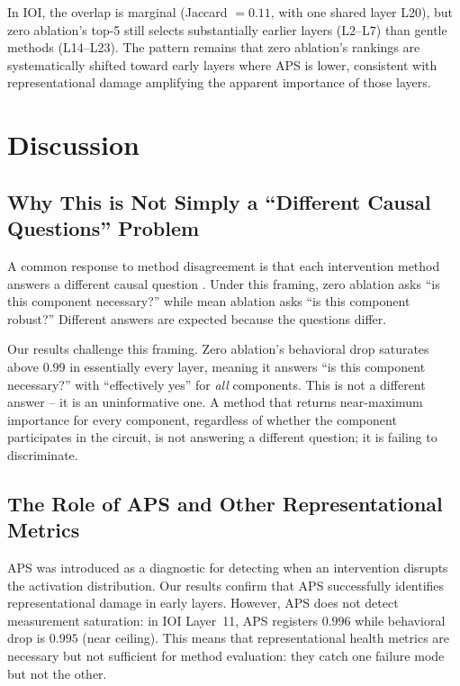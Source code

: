 \documentclass[pdflatex,sn-mathphys-num]{sn-jnl}
\begin{document}
In IOI, the overlap is marginal (Jaccard $= 0.11$, with one shared layer L20), but zero ablation's top-5 still selects substantially earlier layers (L2--L7) than gentle methods (L14--L23). The pattern remains that zero ablation's rankings are systematically shifted toward early layers where APS is lower, consistent with representational damage amplifying the apparent importance of those layers.

\section{Discussion}

\subsection{Why This is Not Simply a ``Different Causal Questions'' Problem}

A common response to method disagreement is that each intervention method answers a different causal question \citep{Miller2024}. Under this framing, zero ablation asks ``is this component necessary?'' while mean ablation asks ``is this component robust?'' Different answers are expected because the questions differ.

Our results challenge this framing. Zero ablation's behavioral drop saturates above $0.99$ in essentially every layer, meaning it answers ``is this component necessary?'' with ``effectively yes'' for \emph{all} components. This is not a different answer -- it is an uninformative one. A method that returns near-maximum importance for every component, regardless of whether the component participates in the circuit, is not answering a different question; it is failing to discriminate.

\subsection{The Role of APS and Other Representational Metrics}

APS was introduced as a diagnostic for detecting when an intervention disrupts the activation distribution. Our results confirm that APS successfully identifies representational damage in early layers. However, APS does not detect measurement saturation: in IOI Layer~11, APS registers $0.996$ while behavioral drop is $0.995$ (near ceiling). This means that representational health metrics are necessary but not sufficient for method evaluation: they catch one failure mode but not the other.
\end{document}
